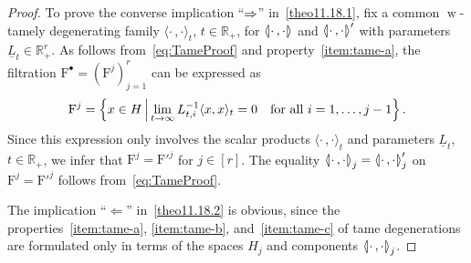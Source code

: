 \documentclass[AHL,Unicode,longabstracts]{cedram}
\newcommand{\innone}[2]{{\langle#2\rangle_{#1}}}
\newcommand{\llangle}{\mathopen{\langle\mkern -3.1mu\lvert}}
\newcommand{\rrangle}{\mathclose{\rvert\mkern -3.1mu\rangle}}
\newcommand{\highinn}[2]{{\llangle#2\rrangle_{#1}}}
\newcommand{\highinnprime}[2]{{\llangle #2\rrangle'_{#1}}}
\DeclareMathOperator{\weak}{w}
\newcommand{\filter}{\mathrm{F}}
\newcommand{\R}{\mathbb{R}}
\renewcommand*{\to}{\mathchoice{\longrightarrow}{\rightarrow}{\rightarrow}{\rightarrow}}
\renewcommand*{\implies}{\mathchoice{\Longrightarrow}{\Rightarrow}{\Rightarrow}{\Rightarrow}}
\begin{document}
\begin{proof}
To prove the converse implication ``$\implies$'' in~\eqref{theo11.18.1}, fix a common $\weak$-tamely degenerating family $\innone{t}{\cdot \,, \cdot}$, $t \in \R_+$, for $\highinn{}{\cdot \,, \cdot }$ and $\highinnprime{}{\cdot \,, \cdot }$ with parameters $\underline L_t \in \R_+^r$. As follows from~\eqref{eq:TameProof} and property~\eqref{item:tame-a}, the filtration $\filter^\bullet = (\filter^j)_{j=1}^r$ can be expressed as
\[
\filter^j = \left\{ x \in H \,\middle|\, \lim_{t \to \infty} L_{t,i}^{-1} \innone{t}{x,x} = 0 \quad\text{for all } i = 1, \dots, j-1 \right\}.
\]
Since this expression only involves the scalar products $\innone{t}{\cdot \,, \cdot}$ and parameters $\underline L_t$, $t \in \R_+$, we infer that $\filter^j = {\filter'}^j$ for $j \in [r]$. The equality $\highinn{j}{\cdot\,,\cdot} = \highinnprime{j}{\cdot\,,\cdot}$ on $\filter^j = {\filter'}^j$ follows from~\eqref{eq:TameProof}.

The implication ``$\Leftarrow$'' in~\eqref{theo11.18.2} is obvious, since the properties~\eqref{item:tame-a}, \eqref{item:tame-b}, and~\eqref{item:tame-c} of tame degenerations are formulated only in terms of the spaces $H_j$ and components $\highinn{j}{\cdot\,,\cdot}$.


\end{proof}
\end{document}
